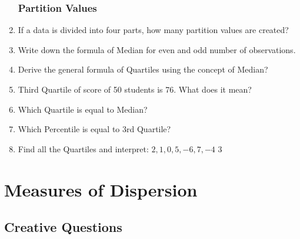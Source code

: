 \documentclass[a4paper,oneside]{book}
\begin{document}
\begin{enumerate}
\subsection{Partition Values}
    \item If a data is divided into four parts, how many partition values are created?
    \item Write down the formula of Median for even and odd number of observations.
    \item Derive the general formula of Quartiles using the concept of Median?
    \item Third Quartile of score of 50 students is 76. What does it mean?
    \item Which Quartile is equal to Median?
    \item Which Percentile is equal to 3rd Quartile?
    \item Find all the Quartiles and interpret: $2,1,0,5,-6,7,-4$ \hfill 3

    
\end{enumerate}

\chapter{Measures of Dispersion} 
\section{Creative Questions}
\end{document}
